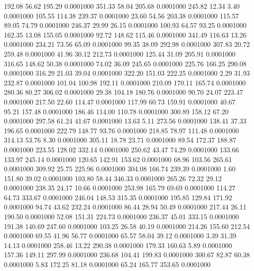  192.08   56.62  195.29   0.0001000
 351.33   58.04  205.68   0.0001000
 245.82   12.34    3.40   0.0001000
 105.55  114.38  239.37   0.0001000
  23.60   54.56  203.38   0.0001000
 115.57   89.05   74.79   0.0001000
 246.37   29.99   26.15   0.0001000
 100.93   64.57   93.25   0.0001000
 162.35   13.08  155.05   0.0001000
  92.72  148.62  115.46   0.0001000
 341.49  116.63   13.26   0.0001000
 234.21   73.56   65.09   0.0001000
  99.35   38.09  292.98   0.0001000
 307.83   20.72  259.48   0.0001000
  41.96   30.12  212.73   0.0001000
 125.44   31.09  205.91   0.0001000
 316.65  148.62   50.38   0.0001000
  74.02   36.09  245.65   0.0001000
 225.76  166.25  290.08   0.0001000
 316.29   21.03   39.04   0.0001000
 322.20  151.03  222.25   0.0001000
   2.29   31.93  232.87   0.0001000
 101.04  100.98  192.11   0.0001000
 210.09  170.11  165.74   0.0001000
 280.36   80.27  306.02   0.0001000
  29.38  104.18  180.76   0.0001000
  90.70   24.07  223.47   0.0001000
 217.50   22.60  114.47   0.0001000
 117.99   60.73  159.91   0.0001000
  40.67   95.21  157.48   0.0001000
 186.46  114.00  110.78   0.0001000
 300.89  158.12   67.20   0.0001000
 297.58   61.24   41.67   0.0001000
  13.63    5.11  273.56   0.0001000
 138.41   37.33  196.65   0.0001000
 222.79  148.77   93.76   0.0001000
 218.85   78.97  111.48   0.0001000
 314.13   53.76    8.30   0.0001000
 305.11   18.78   23.71   0.0001000
  89.54  172.37  188.87   0.0001000
 223.55  128.02  332.14   0.0001000
 250.62   43.47   74.29   0.0001000
 133.66  133.97  245.14   0.0001000
 120.65  142.91  153.62   0.0001000
  68.96  103.56  265.61   0.0001000
 309.92   25.75  225.96   0.0001000
 304.08  166.74  239.39   0.0001000
   1.60  151.80   39.02   0.0001000
 103.80   58.44  346.33   0.0001000
 265.26   72.32   29.12   0.0001000
 238.35   24.17   10.66   0.0001000
 253.98  165.79   69.69   0.0001000
 114.27   64.73  333.67   0.0001000
 246.04  148.53  315.35   0.0001000
 195.85  129.84  171.92   0.0001000
  94.74   43.62  232.24   0.0001000
  86.44   28.94   50.49   0.0001000
 217.44   26.11  190.50   0.0001000
  52.08  151.31  224.73   0.0001000
 236.37   45.01  333.15   0.0001000
 191.38  140.69  247.60   0.0001000
 103.25   26.58   40.19   0.0001000
 214.26  155.60  212.54   0.0001000
  69.55   41.96   56.77   0.0001000
  65.57   58.04   39.12   0.0001000
   3.39   31.39   14.13   0.0001000
 258.46   13.22  290.38   0.0001000
 179.33  160.63    5.89   0.0001000
 157.36  149.11  297.99   0.0001000
 236.68  104.41  199.83   0.0001000
 300.67   82.87   60.38   0.0001000
   5.83  172.25   81.18   0.0001000
  65.24  165.77  353.65   0.0001000
